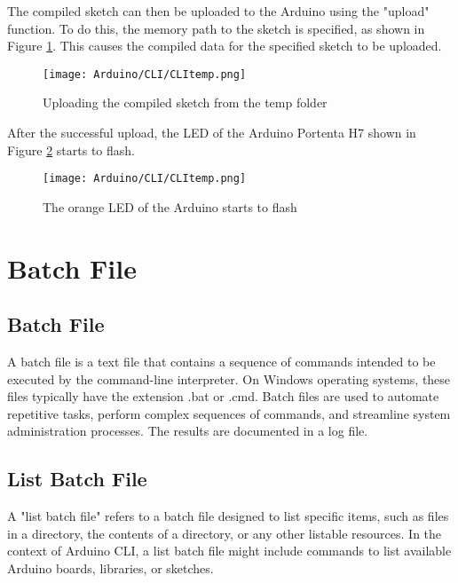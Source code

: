 The compiled sketch can then be uploaded to the Arduino using the "upload" function. To do this, the memory path to the sketch is specified, as shown in Figure \ref{UploadSketch}. This causes the compiled data for the specified sketch to be uploaded.

\begin{figure}
    \begin{center}
        \texttt{[image: Arduino/CLI/CLItemp.png]}
        \caption{Uploading the compiled sketch from the temp folder}
        \label{UploadSketch}
    \end{center}
\end{figure}

After the successful upload, the LED of the Arduino Portenta H7 shown in Figure \ref{LEDflash} starts to flash.
\begin{figure}
    \begin{center}
        \texttt{[image: Arduino/CLI/CLItemp.png]}
        \caption{The orange LED of the Arduino starts to flash}
        \label{LEDflash}
    \end{center}
\end{figure}

\section{Batch File}

\subsection{Batch File}

A batch file is a text file that contains a sequence of commands intended to be executed by the command-line interpreter. On Windows operating systems, these files typically have the extension .bat or .cmd. Batch files are used to automate repetitive tasks, perform complex sequences of commands, and streamline system administration processes. The results are documented in a log file. 

\subsection{List Batch File}
A "list batch file" refers to a batch file designed to list specific items, such as files in a directory, the contents of a directory, or any other listable resources. In the context of Arduino CLI, a list batch file might include commands to list available Arduino boards, libraries, or sketches.


